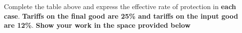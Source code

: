 \documentclass[12pt]{exam}
\begin{document}
\begin{questions}
\newpage 



\question[10]
Complete the table above and express the effective rate of protection in \textbf{each case}. 
\textbf{Tariffs on the final good are 25\% and tariffs on the input good are 12\%}.
\textbf{Show your work in the space provided below}

\end{questions}
\end{document}
